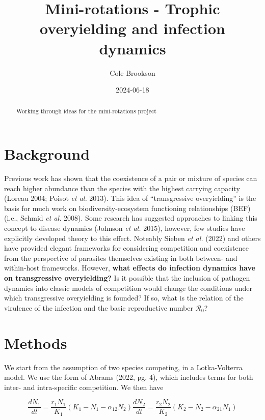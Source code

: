\documentclass[
  letterpaper,
  DIV=11,
  numbers=noendperiod]{scrartcl}
\title{Mini-rotations - Trophic overyielding and infection dynamics}
\author{Cole Brookson}
\date{2024-06-18}
\renewcommand*\contentsname{Table of contents}
\newcommand\contentsname{Table of contents}
\begin{document}
\maketitle
\begin{abstract}
Working through ideas for the mini-rotations project
\end{abstract}

\renewcommand*\contentsname{Table of contents}
{
\hypersetup{linkcolor=}
\setcounter{tocdepth}{3}
\tableofcontents
}
\section{Background}

Previous work has shown that the coexistence of a pair or mixture of
species can reach higher abundance than the species with the highest
carrying capacity (Loreau 2004; Poisot \emph{et al.} 2013). This idea of
``transgressive overyielding'' is the basis for much work on
biodiversity-ecosystem functioning relationships (BEF) (i.e., Schmid
\emph{et al.} 2008). Some research has suggested approaches to linking
this concept to disease dynamics (Johnson \emph{et al.} 2015), however,
few studies have explicitly developed theory to this effect. Noteably
Sieben \emph{et al.} (2022) and others have provided elegant frameworks
for considering competition and coexistence from the perspective of
parasites themselves existing in both between- and within-host
frameworks. However,
\textbf{what effects do infection dynamics have on transgressive overyielding?}
Is it possible that the inclusion of pathogen dynamics into classic
models of competition would change the conditions under which
transgressive overyielding is founded? If so, what is the relation of
the virulence of the infection and the basic reproductive number
\(\mathcal{R_0}\)?

\section{Methods}

We start from the assumption of two species competing, in a
Lotka-Volterra model. We use the form of Abrams (2022, pg. 4), which
includes terms for both inter- and intra-specific competition. We then
have

\begin{subequations}\label{eq:lv}
\begin{equation}
 \frac{dN_1}{dt} = \frac{r_1N_1}{K_1}(K_1 - N_1 - \alpha_{12}N_2)
\end{equation}
\begin{equation}
  \frac{dN_2}{dt} = \frac{r_2N_2}{K_2}(K_2 - N_2 - \alpha_{21}N_1) 
\end{equation}
\end{subequations}
\end{document}
